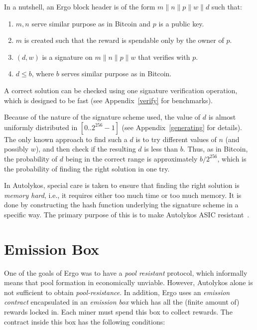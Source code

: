 \documentclass[runningheads]{llncs}
\newcommand{\powname}{Autolykos\xspace}
\begin{document}
In a nutshell, an Ergo block header is of the form $m\|n\|p\|w\|d$ such that:
\begin{enumerate}
	\item $m, n$ serve similar purpose as in Bitcoin and $p$ is a public key.
	\item $m$ is created such that the reward is spendable only by the owner of $p$.
	\item $(d, w)$ is a signature on $m\|n\|p\|w$ that verifies with $p$.
	\item $d\leq b$, where $b$ serves similar purpose as in Bitcoin. 
\end{enumerate}

A correct solution can be checked using one signature verification operation, which is designed to be fast (see Appendix~\ref{verify} for benchmarks).

Because of the nature of the signature scheme used, the value of $d$ is almost uniformly distributed in $[0..2^{256}-1]$ (see Appendix~\ref{generating} for details). The only known approach to find such a $d$ is to try different values of $n$ (and possibly $w$), and then check if the resulting $d$ is less than $b$.
Thus, as in Bitcoin, the probability of $d$ being in the correct range is approximately $b/2^{256}$, which is the probability of finding the right solution in one try.
  
In \powname, special care is taken to ensure that finding the right solution is {\em memory hard}, i.e., it requires either too much time or too much memory. It is done by constructing the hash function underlying the signature scheme in a specific way. The primary purpose of this is to make \powname ASIC resistant~\cite{autolykos}. 
\section{Emission Box}

\label{emission}

One of the goals of Ergo was to have a {\em pool resistant} protocol, which informally means that pool formation in economically unviable.
However, \powname alone is not sufficient to obtain {\em pool-resistance}. In addition, Ergo uses an {\em emission contract} encapsulated in an {\em emission box} which has all the (finite amount of) rewards locked in. Each miner must spend this box to collect rewards. The contract inside this box has the following conditions:
\end{document}
